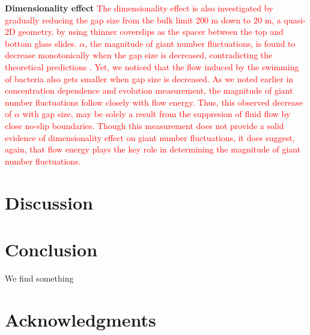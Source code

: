 \documentclass[twocolumn,aps,pre,amsmath,amssymb,longbibliography]{revtex4-1}
\begin{document}
\textbf{Dimensionality effect} \textcolor{red}{The dimensionality effect is also investigated by gradually reducing the gap size from the bulk limit 200 \textmu m down to 20 \textmu m, a quasi-2D geometry, by using thinner coverslips as the spacer between the top and bottom glass slides. $\alpha$, the magnitude of giant number fluctuations, is found to decrease monotonically when the gap size is decreased, contradicting the theoretical predictions \cite{}. Yet, we noticed that the flow induced by the swimming of bacteria also gets smaller when gap size is decreased. As we noted earlier in concentration dependence and evolution measurement, the magnitude of giant number fluctuations follow closely with flow energy. Thus, this observed decrease of $\alpha$ with gap size, may be solely a result from the suppresion of fluid flow by close no-slip boundaries. Though this measurement does not provide a solid evidence of dimensionality effect on giant number fluctuations, it does suggest, again, that flow energy plays the key role in determining the magnitude of giant number fluctuations.}

\section{Discussion}





\section{Conclusion}
We find something

\section*{Acknowledgments}


%

\end{document}
